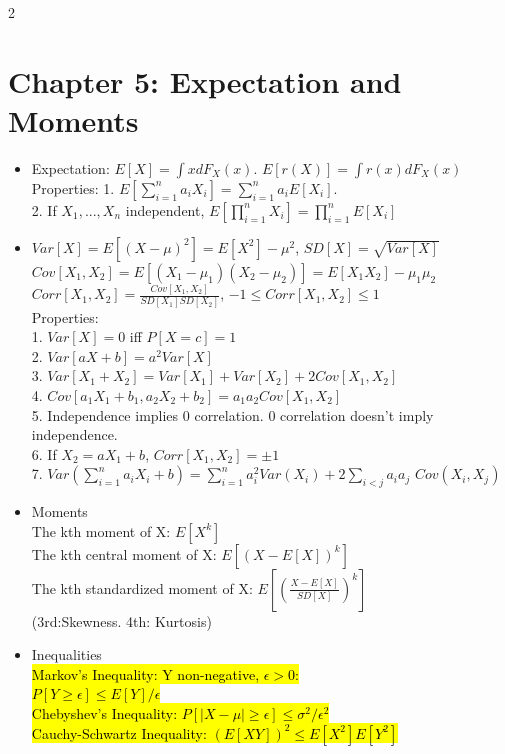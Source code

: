 \documentclass[a4paper,10pt]{article}
\begin{document}
\begin{multicols}{2}
\section*{Chapter 5: Expectation and Moments}
\begin{itemize}
    \item Expectation: $E[X]=\int xdF_X(x)$. $E[r(X)]=\int r(x)dF_X(x)$\\
    Properties: 1. $E[\sum_{i=1}^na_iX_i]=\sum_{i=1}^na_iE[X_i]$.\\
    2. If $X_1,...,X_n$ independent, $E[\prod_{i=1}^nX_i]=\prod_{i=1}^nE[X_i]$
    \item $Var[X]=E[(X-\mu)^2]=E[X^2]-\mu^2$, $SD[X]=\sqrt{Var[X]}$\\
    $Cov[X_1,X_2]=E[(X_1-\mu_1)(X_2-\mu_2)]=E[X_1X_2]-\mu_1\mu_2$\\
    $Corr[X_1,X_2]=\frac{Cov[X_1,X_2]}{SD[X_1]SD[X_2]}$, $-1\le Corr[X_1,X_2]\le 1$\\
    Properties: \\
    1. $Var[X]=0$ iff $P[X=c]=1$\\
    2. $Var[aX+b]=a^2Var[X]$\\
    3. $Var[X_1+X_2]=Var[X_1]+Var[X_2]+2Cov[X_1,X_2]$\\
    4. $Cov[a_1X_1+b_1,a_2X_2+b_2]=a_1a_2Cov[X_1,X_2]$\\
    5. Independence implies 0 correlation. 0 correlation doesn't imply independence.\\
    6. If $X_2=aX_1+b$, $Corr[X_1,X_2]=\pm 1$\\
    7. $Var(\sum_{i=1}^n a_i X_i+b)=\sum_{i=1}^na_i^2Var(X_i) + 2\sum_{i<j}a_ia_j$ $Cov(X_i,X_j)$
    \item Moments\\
    The kth moment of X: $E[X^k]$\\
    The kth central moment of X: $E[(X-E[X])^k]$\\
    The kth standardized moment of X: $E[(\frac{X-E[X]}{SD[X]})^k]$\\
    (3rd:Skewness. 4th: Kurtosis)
    \item Inequalities\\
    \hl{Markov's Inequality: Y non-negative, $\epsilon >0$:\\ $P[Y\ge \epsilon]\le E[Y]/\epsilon$\\
    Chebyshev's Inequality: $P[|X-\mu|\ge \epsilon] \le \sigma^2/\epsilon^2$\\
    Cauchy-Schwartz Inequality: $(E[XY])^2\le E[X^2]E[Y^2]$}\\

\end{itemize}
\end{multicols}
\end{document}
